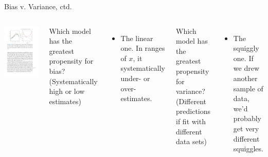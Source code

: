 \documentclass[aspectratio=169]{beamer}
\begin{document}
\begin{frame}{Bias v. Variance, ctd.}


\begin{columns}

\includegraphics[scale=1]{figures/islr2_9a.pdf}


Which model has the greatest propensity for bias? (Systematically high or low estimates)
\begin{itemize}
\item<2-> The linear one.  In ranges of $x$, it systematically under- or over-estimates. 
\end{itemize}

\hspace{5mm}

Which model has the greatest propensity for variance? (Different predictions if fit with different data sets)
\begin{itemize}
\item<3-> The squiggly one.  If we drew another sample of data, we'd probably get very different squiggles.
\end{itemize}
\end{columns}



\end{frame}
\end{document}
